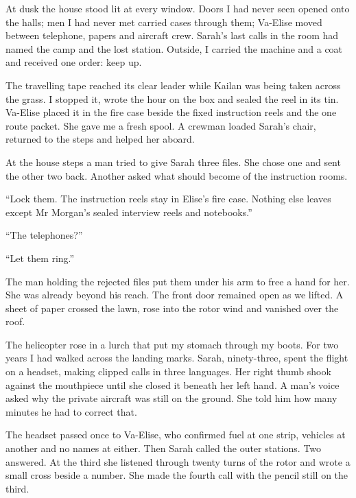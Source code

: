 At dusk the house stood lit at every window. Doors I had never seen opened onto the halls; men I had never met carried cases through them; Va-Elise moved between telephone, papers and aircraft crew. Sarah's last calls in the room had named the camp and the lost station. Outside, I carried the machine and a coat and received one order: keep up.\par

The travelling tape reached its clear leader while Kailan was being taken across the grass. I stopped it, wrote the hour on the box and sealed the reel in its tin. Va-Elise placed it in the fire case beside the fixed instruction reels and the one route packet. She gave me a fresh spool. A crewman loaded Sarah's chair, returned to the steps and helped her aboard.\par

At the house steps a man tried to give Sarah three files. She chose one and sent the other two back. Another asked what should become of the instruction rooms.\par

``Lock them. The instruction reels stay in Elise's fire case. Nothing else leaves except Mr Morgan's sealed interview reels and notebooks.''\par

``The telephones?''\par

``Let them ring.''\par

The man holding the rejected files put them under his arm to free a hand for her. She was already beyond his reach. The front door remained open as we lifted. A sheet of paper crossed the lawn, rose into the rotor wind and vanished over the roof.\par

The helicopter rose in a lurch that put my stomach through my boots. For two years I had walked across the landing marks. Sarah, ninety-three, spent the flight on a headset, making clipped calls in three languages. Her right thumb shook against the mouthpiece until she closed it beneath her left hand. A man's voice asked why the private aircraft was still on the ground. She told him how many minutes he had to correct that.\par

The headset passed once to Va-Elise, who confirmed fuel at one strip, vehicles at another and no names at either. Then Sarah called the outer stations. Two answered. At the third she listened through twenty turns of the rotor and wrote a small cross beside a number. She made the fourth call with the pencil still on the third.\par

